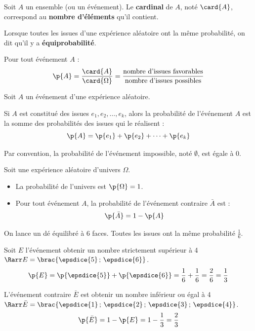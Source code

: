 \begin{defn}
	Soit $A$ un ensemble (ou un événement). Le \textbf{cardinal} de $A$, noté $\card{A}$, correspond au \textbf{nombre d'éléments} qu'il contient.
\end{defn}

\begin{prop}
	Lorsque toutes les issues d'une expérience aléatoire ont la même probabilité, on dit qu'il y a \textbf{équiprobabilité}.

	Pour tout événement $A$ :
	\[
		\p{A} = \dfrac{\card{A}}{\card{\Omega}} = \dfrac{\text{nombre d'issues favorables}}{\text{nombre d'issues possibles}}
	\]
\end{prop}

\begin{prop}
	Soit $A$ un événement d'une expérience aléatoire.

	Si $A$ est constitué des issues $e_1, e_2, \dots, e_k$, alors la probabilité de l'événement $A$ est la somme des probabilités des issues qui le réalisent :
	\[
		\p{A} = \p{e_1} + \p{e_2} + \dots + \p{e_k}
	\]
\end{prop}

\begin{rem}
	Par convention, la probabilité de l'événement impossible, noté $\emptyset$, est égale à $0$.
\end{rem}

\begin{prop}
	Soit une expérience aléatoire d'univers $\Omega$.

	\begin{itemize}
		\item La probabilité de l'univers est $\p{\Omega} = 1$.
		\item Pour tout événement $A$, la probabilité de l'événement contraire $\bar{A}$ est :
		      \[
			      \p{\bar{A}} = 1 - \p{A}
		      \]
	\end{itemize}
\end{prop}

\begin{ex}
	On lance un dé équilibré à 6 faces. Toutes les issues ont la même probabilité $\frac{1}{6}$.

	Soit $E$ l'événement \og obtenir un nombre strictement supérieur à 4 \fg{} $\Rarr E = \brac{\epsdice{5}\,;\,\epsdice{6}}$.
	\[
		\p{E} = \p{\epsdice{5}} + \p{\epsdice{6}} = \dfrac{1}{6} + \dfrac{1}{6} = \dfrac{2}{6} = \dfrac{1}{3}
	\]

	L'événement contraire $\bar{E}$ est \og obtenir un nombre inférieur ou égal à 4 \fg{} $\Rarr \bar{E} = \brac{\epsdice{1}\,;\,\epsdice{2}\,;\,\epsdice{3}\,;\,\epsdice{4}}$.
	\[
		\p{\bar{E}} = 1 - \p{E} = 1 - \dfrac{1}{3} = \dfrac{2}{3}
	\]
\end{ex}

